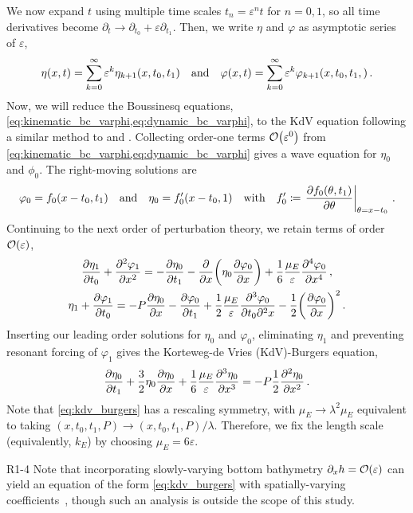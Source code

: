 \documentclass{jfm}
\renewcommand*{\epsilon}{\varepsilon}
\begin{document}
We now expand $t$ using multiple time scales $t_n =
\epsilon^n t$ for $n= 0,1$, so all time derivatives become $\partial_t \to
\partial_{t_0} + \epsilon \partial_{t_1}$.
Then, we write $\eta$ and $\varphi$ as asymptotic series of $\epsilon$,
\begin{equation}
  \eta(x,t) = \sum_{k=0}^{\infty} \epsilon^k
    \eta_{k+1}(x,t_0,t_1) \qq{and}
  \varphi(x,t) = \sum_{k=0}^{\infty} \epsilon^k
    \varphi_{k+1}(x,t_0,t_1,) \,.
\end{equation}
Now, we will reduce the Boussinesq equations,
\cref{eq:kinematic_bc_varphi,eq:dynamic_bc_varphi}, to the KdV equation
following a similar method to \citet{mei2005nonlinear} and
\citet{ablowitz2011nonlinear}.
Collecting order-one terms $\order{\epsilon^0}$ from
\cref{eq:kinematic_bc_varphi,eq:dynamic_bc_varphi} gives
a wave equation for $\eta_0$ and $\phi_0$.
The right-moving solutions are
\begin{equation}
  \varphi_0 = f_0(x-t_0,t_1) \qq{and}
  \eta_0 = f'_0(x-t_0,1) \qq{with}
  f_0' \coloneqq \eval{\pdv{f_0(\theta,t_1)}{\theta}}_{\theta = x-t_0} \,.
\end{equation}
Continuing to the next order of perturbation theory, we retain terms of
order $\order{\epsilon}$,
\begin{gather}
    \pdv{\eta_1}{t_0} + \pdv[2]{\varphi_{1}}{x} =
      -\pdv{\eta_0}{t_1} - \pdv{x} \pqty{\eta_0 \pdv{\varphi_0}{x}} +
      \frac{1}{6} \frac{\mu_E}{\epsilon} \pdv[4]{\varphi_0}{x} \,,
  \\
    \eta_1 + \pdv{\varphi_1}{t_0} = -P \pdv{\eta_0}{x} -\pdv{\varphi_0}{t_1}
      + \frac{1}{2} \frac{\mu_E}{\epsilon} \frac{\partial^3 \varphi_0}
        {\partial t_0 \partial^2 x}
      - \frac{1}{2} \pqty{ \pdv{\varphi_0}{x} }^2
  \,.
\end{gather}
Inserting our leading order solutions for $\eta_0$ and $\varphi_0$,
eliminating $\eta_1$ and preventing resonant forcing of $\varphi_1$
gives the Korteweg-de Vries (KdV)-Burgers equation,
\begin{equation}
  \pdv{\eta_0}{t_1} + \frac{3}{2}
    \eta_0 \pdv{\eta_0}{x} + \frac{1}{6} \frac{\mu_E}{\epsilon}
    \pdv[3]{\eta_0}{x} = -P \frac{1}{2} \pdv[2]{\eta_0}{x} \,.
  \label{eq:kdv_burgers}
\end{equation}
Note that \cref{eq:kdv_burgers} has a rescaling symmetry, with $\mu_E
\to \lambda^2 \mu_E$ equivalent to taking $(x,t_0,t_1,P) \to
(x,t_0,t_1,P)/\lambda$.
Therefore, we fix the length scale (equivalently, $k_E$) by choosing
$\mu_E = 6 \epsilon$.
\begin{LineLabel}{R1-4}
Note that incorporating slowly-varying bottom bathymetry $\partial_x h =
\order{\epsilon}$ can yield an equation of the form
\cref{eq:kdv_burgers} with spatially-varying
coefficients~\citep[\eg][]{johnson1972some,ono1972wave}, though such an
analysis is outside the scope of this study.
\end{LineLabel}
\end{document}
